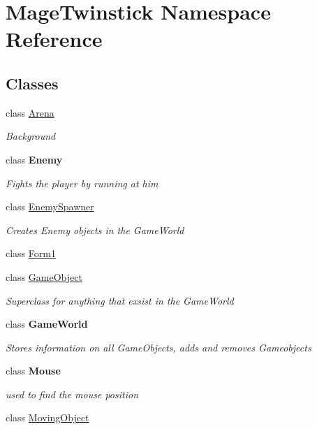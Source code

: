 \hypertarget{namespace_mage_twinstick}{}\section{Mage\+Twinstick Namespace Reference}
\label{namespace_mage_twinstick}
\subsection*{Classes}
\begin{DoxyCompactItemize}
\item 
class \hyperlink{class_mage_twinstick_1_1_arena}{Arena}
\begin{DoxyCompactList}\small\item\em Background \end{DoxyCompactList}\item 
class {\bfseries Enemy}
\begin{DoxyCompactList}\small\item\em Fights the player by running at him \end{DoxyCompactList}\item 
class \hyperlink{class_mage_twinstick_1_1_enemy_spawner}{Enemy\+Spawner}
\begin{DoxyCompactList}\small\item\em Creates Enemy objects in the Game\+World \end{DoxyCompactList}\item 
class \hyperlink{class_mage_twinstick_1_1_form1}{Form1}
\item 
class \hyperlink{class_mage_twinstick_1_1_game_object}{Game\+Object}
\begin{DoxyCompactList}\small\item\em Superclass for anything that exsist in the Game\+World \end{DoxyCompactList}\item 
class {\bfseries Game\+World}
\begin{DoxyCompactList}\small\item\em Stores information on all Game\+Objects, adds and removes Gameobjects \end{DoxyCompactList}\item 
class {\bfseries Mouse}
\begin{DoxyCompactList}\small\item\em used to find the mouse position \end{DoxyCompactList}\item 
class \hyperlink{class_mage_twinstick_1_1_moving_object}{Moving\+Object}

\end{DoxyCompactItemize}
